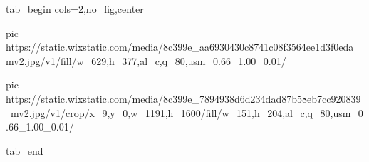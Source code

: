  
 
 
 
 


\ifcmt
  tab_begin cols=2,no_fig,center

     pic https://static.wixstatic.com/media/8c399e_aa6930430c8741c08f3564ee1d3f0eda~mv2.jpg/v1/fill/w_629,h_377,al_c,q_80,usm_0.66_1.00_0.01/%

		 pic https://static.wixstatic.com/media/8c399e_7894938d6d234dad87b58eb7cc920839~mv2.jpg/v1/crop/x_9,y_0,w_1191,h_1600/fill/w_151,h_204,al_c,q_80,usm_0.66_1.00_0.01/%

  tab_end
\fi
